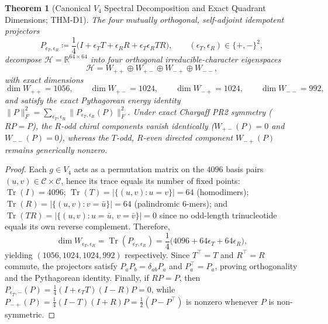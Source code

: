 \documentclass[11pt, a4paper]{article}
\newtheorem{theorem}{Theorem}[section]
\DeclareRobustCommand{\_}{\textunderscore\allowbreak}
\begin{document}
\begin{theorem}[Canonical $V_4$ Spectral Decomposition and Exact Quadrant Dimensions; THM-D1]
\label{thm:v4_decomp}
The four mutually orthogonal, self-adjoint idempotent projectors
\begin{equation}
    P_{\epsilon_T, \epsilon_R} \coloneqq \frac{1}{4}\bigl(I + \epsilon_T T + \epsilon_R R + \epsilon_T \epsilon_R TR\bigr), \qquad (\epsilon_T, \epsilon_R) \in \{+, -\}^2,
\end{equation}
decompose $\mathcal{H} = \mathbb{R}^{64 \times 64}$ into four orthogonal irreducible-character eigenspaces
\begin{equation}
    \mathcal{H} = W_{++} \oplus W_{+-} \oplus W_{-+} \oplus W_{--},
\end{equation}
with exact dimensions
\begin{equation}
    \dim W_{++} = 1056, \qquad \dim W_{+-} = 1024, \qquad \dim W_{-+} = 1024, \qquad \dim W_{--} = 992,
\end{equation}
and satisfy the exact Pythagorean energy identity $\|P\|_F^2 = \sum_{\epsilon_T, \epsilon_R} \|P_{\epsilon_T, \epsilon_R}(P)\|_F^2$. Under exact Chargaff PR2 symmetry ($R P = P$), the $R$-odd chiral components vanish identically ($W_{+-}(P) = 0$ and $W_{--}(P) = 0$), whereas the $T$-odd, $R$-even directed component $W_{-+}(P)$ remains generically nonzero.
\end{theorem}

\begin{proof}
Each $g \in V_4$ acts as a permutation matrix on the $4096$ basis pairs $(u, v) \in \mathcal{C} \times \mathcal{C}$, hence its trace equals its number of fixed points: $\operatorname{Tr}(I) = 4096$; $\operatorname{Tr}(T) = |\{(u,v): u=v\}| = 64$ (homodimers); $\operatorname{Tr}(R) = |\{(u,v): v = \bar{u}\}| = 64$ (palindromic 6-mers); and $\operatorname{Tr}(TR) = |\{(u,v): u=\bar{u},\, v=\bar{v}\}| = 0$ since no odd-length trinucleotide equals its own reverse complement. Therefore,
\begin{equation}
    \dim W_{\epsilon_T, \epsilon_R} = \operatorname{Tr}(P_{\epsilon_T, \epsilon_R}) = \frac{1}{4}\bigl(4096 + 64\epsilon_T + 64\epsilon_R\bigr),
\end{equation}
yielding $(1056, 1024, 1024, 992)$ respectively. Since $T^\top = T$ and $R^\top = R$ commute, the projectors satisfy $P_a P_b = \delta_{ab} P_a$ and $P_a^\top = P_a$, proving orthogonality and the Pythagorean identity. Finally, if $R P = P$, then $P_{\epsilon_T, -}(P) = \frac{1}{4}(I + \epsilon_T T)(I - R)P = 0$, while $P_{-+}(P) = \frac{1}{4}(I - T)(I + R)P = \frac{1}{2}(P - P^\top)$ is nonzero whenever $P$ is non-symmetric.
\end{proof}
\end{document}
